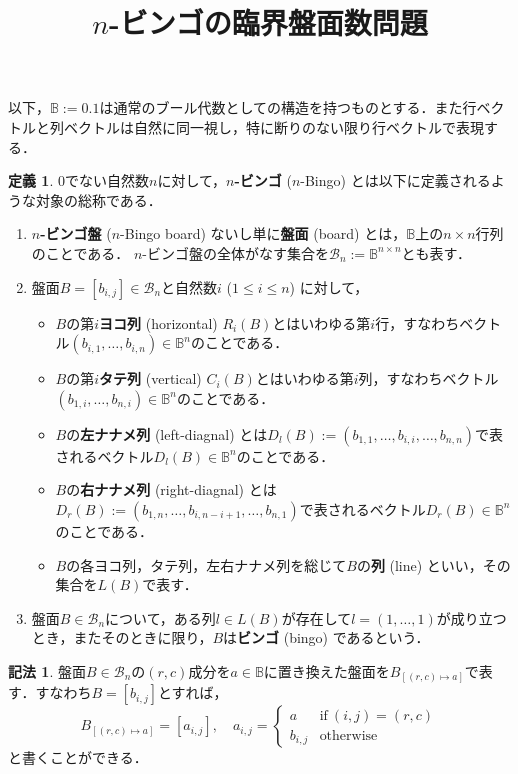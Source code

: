 \documentclass[uplatex,a4paper,dvipdfmx]{jsarticle}
\title{$n$-ビンゴの臨界盤面数問題}
\author{}
\date{}
\theoremstyle{definition}
\newtheorem{dfn}{定義}
\newtheorem{notation}{記法}
\newcommand{\bool}{\mathbb{B}}
\newcommand{\board}{\mathcal{B}}
\begin{document}
\maketitle
以下，$\bool := \qty{0, 1}$は通常のブール代数としての構造を持つものとする．また行ベクトルと列ベクトルは自然に同一視し，特に断りのない限り行ベクトルで表現する．
\begin{dfn}
    0でない自然数$n$に対して，\textbf{$n$-ビンゴ} ($n$-Bingo) とは以下に定義されるような対象の総称である．
    \begin{enumerate}
        \item \textbf{$n$-ビンゴ盤} ($n$-Bingo board) ないし単に\textbf{盤面} (board) とは，$\bool$上の$n \times n$行列のことである．
            $n$-ビンゴ盤の全体がなす集合を$\board_n := \bool^{n \times n}$とも表す．
        \item 盤面$B = [b_{i, j}]\in \board_n$と自然数$i$ ($1 \le i \le n$) に対して，
            \begin{itemize}
                \item $B$の第$i$\textbf{ヨコ列} (horizontal) $R_i(B)$とはいわゆる第$i$行，すなわちベクトル$(b_{i, 1}, \ldots, b_{i, n}) \in \bool^n$のことである．
                \item $B$の第$i$\textbf{タテ列} (vertical) $C_i(B)$とはいわゆる第$i$列，すなわちベクトル$(b_{1, i}, \ldots, b_{n, i}) \in \bool^n$のことである．
                \item $B$の\textbf{左ナナメ列} (left-diagnal) とは$D_l(B) := (b_{1, 1}, \ldots, b_{i, i}, \ldots, b_{n, n})$で表されるベクトル$D_l(B) \in \bool^n$のことである．
                \item $B$の\textbf{右ナナメ列} (right-diagnal) とは$D_r(B) := (b_{1, n}, \ldots, b_{i, n - i + 1}, \ldots, b_{n, 1})$で表されるベクトル$D_r(B) \in \bool^n$のことである．
                \item $B$の各ヨコ列，タテ列，左右ナナメ列を総じて$B$の\textbf{列} (line) といい，その集合を$L(B)$で表す．
            \end{itemize}
        \item 盤面$B \in \board_n$について，ある列$l \in L(B)$が存在して$l = (1, \ldots, 1)$が成り立つとき，またそのときに限り，$B$は\textbf{ビンゴ} (bingo) であるという．
    \end{enumerate}
\end{dfn}
\begin{notation}
    盤面$B \in \board_n$の$(r, c)$成分を$a \in \bool$に置き換えた盤面を$B_{[(r, c) \mapsto a]}$で表す．すなわち$B = [b_{i, j}]$とすれば，
    \begin{equation*}
        B_{[(r, c) \mapsto a]} = [a_{i, j}],\quad
        a_{i, j} = \left\{
            \begin{array}{cl}
                a &\text{if}\ (i, j) = (r, c) \\
                b_{i, j} & \text{otherwise}
            \end{array}
        \right.
    \end{equation*}
    と書くことができる．
\end{notation}
\end{document}
